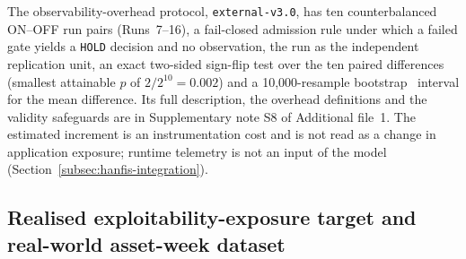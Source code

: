 \documentclass[referee,lineno,pdflatex,sn-basic]{sn-jnl}%
\theoremstyle{thmstyleone}%
\theoremstyle{thmstyletwo}%
\theoremstyle{thmstylethree}%
\begin{document}
The observability-overhead protocol, \texttt{external-v3.0}, has ten counterbalanced ON--OFF run pairs (Runs~7--16), a fail-closed admission rule under which a failed gate yields a \texttt{HOLD} decision and no observation, the run as the independent replication unit, an exact two-sided sign-flip test over the ten paired differences (smallest attainable $p$ of $2/2^{10}=0.002$) and a 10{,}000-resample bootstrap~\citep{efron1979bootstrap} interval for the mean difference. Its full description, the overhead definitions and the validity safeguards are in Supplementary note S8 of Additional file~1. The estimated increment is an instrumentation cost and is not read as a change in application exposure; runtime telemetry is not an input of the model (Section~\ref{subsec:hanfis-integration}).

\subsection{Realised exploitability-exposure target and real-world asset-week dataset}
\label{subsec:target-definition}
\end{document}
